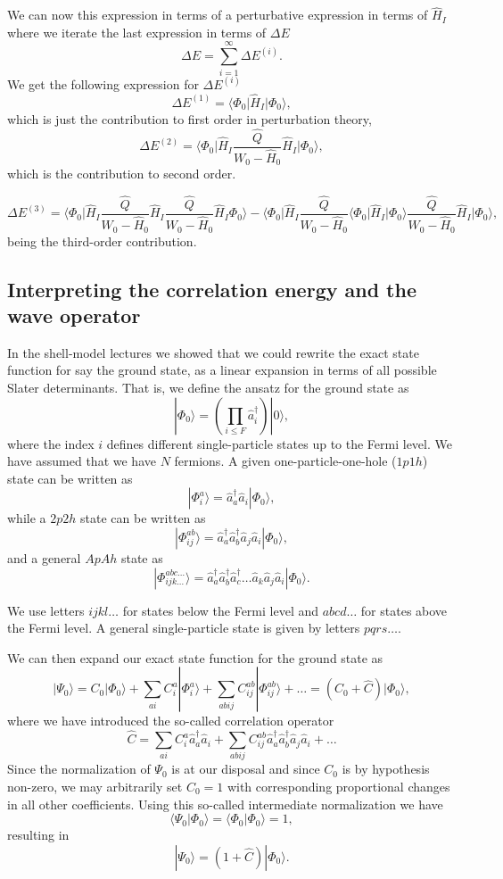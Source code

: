 We can now this expression in terms of a perturbative expression in terms
of $\hat{H}_I$ where we iterate the last expression in terms of $\Delta E$
\[
\Delta E=\sum_{i=1}^{\infty}\Delta E^{(i)}.
\]
We get the following expression for $\Delta E^{(i)}$
\[
\Delta E^{(1)}=\langle \Phi_0\vert \hat{H}_I\vert \Phi_0\rangle,
\] 
which is just the contribution to first order in perturbation theory,
\[
\Delta E^{(2)}=\langle\Phi_0\vert \hat{H}_I\frac{\hat{Q}}{W_0-\hat{H}_0}\hat{H}_I\vert \Phi_0\rangle, 
\]
which is the contribution to second order.



\[
\Delta E^{(3)}=\langle \Phi_0\vert \hat{H}_I\frac{\hat{Q}}{W_0-\hat{H}_0}\hat{H}_I\frac{\hat{Q}}{W_0-\hat{H}_0}\hat{H}_I\Phi_0\rangle-
\langle\Phi_0\vert \hat{H}_I\frac{\hat{Q}}{W_0-\hat{H}_0}\langle \Phi_0\vert \hat{H}_I\vert \Phi_0\rangle\frac{\hat{Q}}{W_0-\hat{H}_0}\hat{H}_I\vert \Phi_0\rangle,
\]
being the third-order contribution. 


\subsection{Interpreting the correlation energy and the wave operator}

In the shell-model lectures we showed that we could rewrite the exact state function for say the ground state, as a linear expansion in terms of all possible Slater determinants. That is, we 
define the ansatz for the ground state as 
\[
|\Phi_0\rangle = \left(\prod_{i\le F}\hat{a}_{i}^{\dagger}\right)|0\rangle,
\]
where the index $i$ defines different single-particle states up to the Fermi level. We have assumed that we have $N$ fermions. 
A given one-particle-one-hole ($1p1h$) state can be written as
\[
|\Phi_i^a\rangle = \hat{a}_{a}^{\dagger}\hat{a}_i|\Phi_0\rangle,
\]
while a $2p2h$ state can be written as
\[
|\Phi_{ij}^{ab}\rangle = \hat{a}_{a}^{\dagger}\hat{a}_{b}^{\dagger}\hat{a}_j\hat{a}_i|\Phi_0\rangle,
\]
and a general $ApAh$ state as 
\[
|\Phi_{ijk\dots}^{abc\dots}\rangle = \hat{a}_{a}^{\dagger}\hat{a}_{b}^{\dagger}\hat{a}_{c}^{\dagger}\dots\hat{a}_k\hat{a}_j\hat{a}_i|\Phi_0\rangle.
\]

We use letters $ijkl\dots$ for states below the Fermi level and $abcd\dots$ for states above the Fermi level. A general single-particle state is given by letters $pqrs\dots$.

We can then expand our exact state function for the ground state 
as
\[
|\Psi_0\rangle=C_0|\Phi_0\rangle+\sum_{ai}C_i^a|\Phi_i^a\rangle+\sum_{abij}C_{ij}^{ab}|\Phi_{ij}^{ab}\rangle+\dots
=(C_0+\hat{C})|\Phi_0\rangle,
\]
where we have introduced the so-called correlation operator 
\[
\hat{C}=\sum_{ai}C_i^a\hat{a}_{a}^{\dagger}\hat{a}_i  +\sum_{abij}C_{ij}^{ab}\hat{a}_{a}^{\dagger}\hat{a}_{b}^{\dagger}\hat{a}_j\hat{a}_i+\dots
\]
Since the normalization of $\Psi_0$ is at our disposal and since $C_0$ is by hypothesis non-zero, we may arbitrarily set $C_0=1$ with 
corresponding proportional changes in all other coefficients. Using this so-called intermediate normalization we have
\[
\langle \Psi_0 | \Phi_0 \rangle = \langle \Phi_0 | \Phi_0 \rangle = 1, 
\]
resulting in 
\[
|\Psi_0\rangle=(1+\hat{C})|\Phi_0\rangle.
\]

